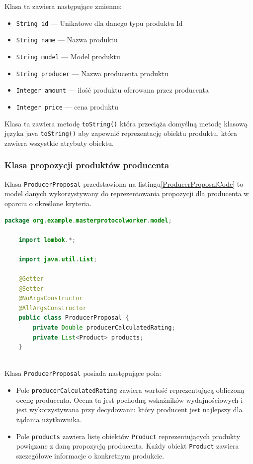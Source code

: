 Klasa ta zawiera następujące zmienne:
\begin{itemize}
    \item \verb|String id| --- Unikatowe dla danego typu produktu Id
    \item \verb|String name| --- Nazwa produktu
    \item \verb|String model| --- Model produktu
    \item \verb|String producer| --- Nazwa producenta produktu
    \item \verb|Integer amount| --- ilość produktu oferowana przez producenta
    \item \verb|Integer price| --- cena produktu
\end{itemize}

Klasa ta zawiera metodę \verb|toString()| która przeciąża domyślną metodę klasową języka java \verb|toString()| aby zapewnić reprezentację obiektu produktu, która zawiera wszystkie atrybuty obiektu.


\subsubsection{Klasa propozycji produktów producenta}

Klasa \verb|ProducerProposal| przedstawiona na listingu\ref{ProducerProposalCode} to model danych wykorzystywany do reprezentowania propozycji dla producenta w oparciu o określone kryteria.

\begin{lstlisting}[language=Java, caption=Kod klasy ProducerProposal,label=ProducerProposalCode]
    package org.example.masterprotocolworker.model;

    import lombok.*;
    
    import java.util.List;
    
    @Getter
    @Setter
    @NoArgsConstructor
    @AllArgsConstructor
    public class ProducerProposal {
        private Double producerCalculatedRating;
        private List<Product> products;
    }
    
\end{lstlisting}

Klasa \verb|ProducerProposal| posiada następujące pola:
\begin{itemize}
    \item Pole \verb|producerCalculatedRating| zawiera wartość reprezentującą obliczoną ocenę producenta. Ocena ta jest pochodną wskaźników wydajnościowych i jest wykorzystywana przy decydowaniu który producent jest najlepszy dla żądania użytkownika.
    \item Pole \verb|products| zawiera listę obiektów \verb|Product| reprezentujących produkty powiązane z daną propozycją producenta. Każdy obiekt \verb|Product| zawiera szczegółowe informacje o konkretnym produkcie.
\end{itemize}

